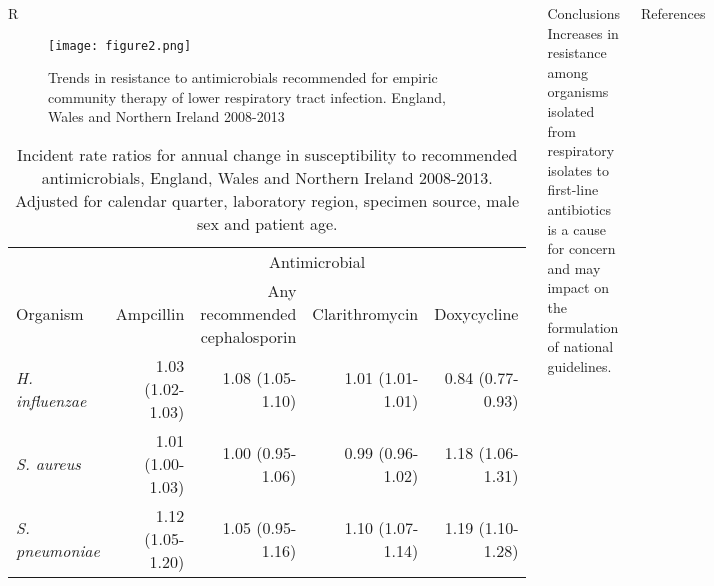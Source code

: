 \documentclass[final, 14pt]{beamer}
\begin{document}
\begin{frame}
\begin{columns}[t]
  \begin{block}{\textcolor{comp_blue}{R}}
  \begin{figure}
  \texttt{[image: figure2.png]}
  \caption{Trends in resistance to antimicrobials recommended for empiric community therapy of lower respiratory tract infection. England, Wales and Northern Ireland 2008-2013}
  \end{figure}
  \label{fig:fig2} 
  \begin{table}
   \centering
   \small%
   \begin{tabular}{lrrrr}
   \toprule
    & \multicolumn{4}{c}{Antimicrobial}\\
    \cline{2-5}
   Organism & Ampcillin & \shortstack{Any \\ recommended \\ cephalosporin} & Clarithromycin & Doxycycline\\
   \midrule
	   \textit{H. influenzae} & 1.03 (1.02-1.03) & 1.08 (1.05-1.10) & 1.01 (1.01-1.01) & 0.84 (0.77-0.93) \\ 
	   \textit{S. aureus} & 1.01 (1.00-1.03) & 1.00 (0.95-1.06) & 0.99 (0.96-1.02) & 1.18 (1.06-1.31) \\ 
	   \textit{S. pneumoniae} & 1.12 (1.05-1.20) & 1.05 (0.95-1.16) & 1.10 (1.07-1.14) & 1.19 (1.10-1.28) \\ 
   \bottomrule
   \end{tabular}
   \caption{Incident rate ratios for annual change in susceptibility to recommended antimicrobials, England, Wales and Northern Ireland 2008-2013.
   Adjusted for calendar quarter, laboratory region, specimen source, male sex and patient age.}
   \label{tab:table1}
   \end{table} 
  \end{block}
  
  \begin{block}{Conclusions}
  Increases in resistance among organisms isolated from respiratory isolates to first-line antibiotics is a cause for concern and may impact on the formulation of national guidelines.  
  
   
  \end{block}
  
  \begin{block}{References}
   
\footnotesize{}
  \end{block}
 \end{columns}

\end{frame}
\end{document}
